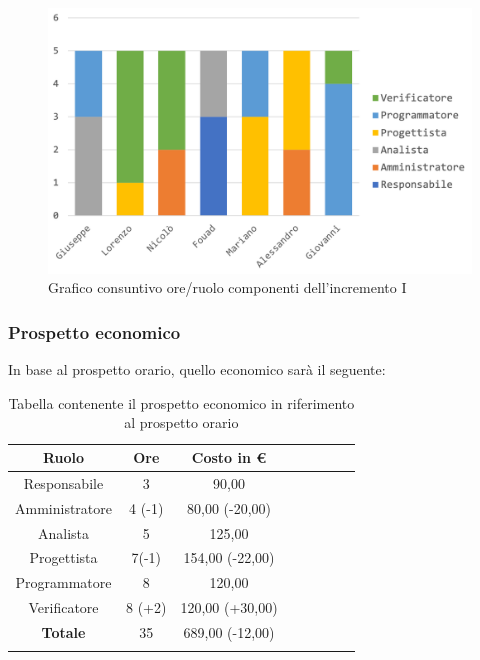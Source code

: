 			\begin{figure}[H]
				\centering
				\includegraphics[width=0.8\linewidth]{images/consuntivo/ConsIncr1-1.png}
				\caption{Grafico consuntivo ore/ruolo componenti dell'incremento I}
				\label{fig:consuntivo grafico suddivione ruoli incremento I}
			\end{figure}
		
		\pagebreak
			
		\subsubsection{Prospetto economico}
			In base al prospetto orario, quello economico sarà il seguente: 
			
			\begin{longtable}{|c|c|c|c|c|c|c|c}
				\hline
				\rowcolor{lighter-grayer}
				\textbf{Ruolo} & \textbf{Ore} & \textbf{Costo in €} \\
				\hline
				\endfirsthead
				\hline
			Responsabile 	    & 3 & 90,00\\
			\hline 
			\hline
			Amministratore	  & 4 (-1)& 80,00 (-20,00)\\
			\hline
			\hline
			Analista 				& 5 & 125,00\\
			\hline
			\hline
			Progettista 		  & 7(-1) & 154,00 (-22,00)\\
			\hline
			\hline
			Programmatore 	 & 8 & 120,00\\
			\hline
			\hline
			Verificatore 		  & 8 (+2) & 120,00 (+30,00)\\
			\hline
			\textbf{Totale} 	& 35 & 689,00 (-12,00)\\
			\hline
				
				\caption{Tabella contenente il prospetto economico in riferimento al prospetto orario}
			\end{longtable}
			
